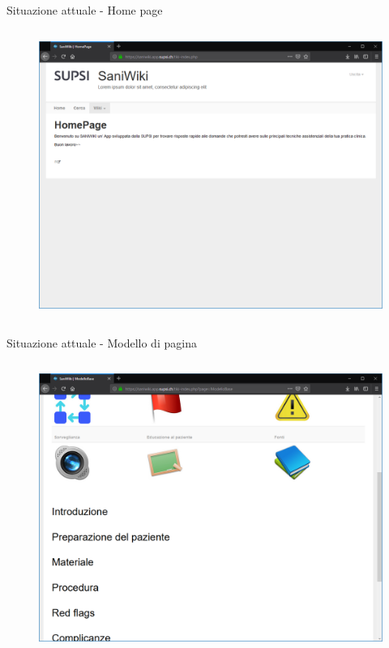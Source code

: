 \documentclass{beamer}
\begin{document}
\begin{frame}{Situazione attuale - Home page}
\begin{columns}
		\begin{figure}[!h]
			\includegraphics[scale=0.2]{saniold_home.png}
		\end{figure}
\end{columns}
\end{frame}

\begin{frame}{Situazione attuale - Modello di pagina}
\begin{columns}
	\begin{figure}[!h]
			\includegraphics[scale=0.2]{saniold_template.png}
		\end{figure}
\end{columns}
\end{frame}
\end{document}

